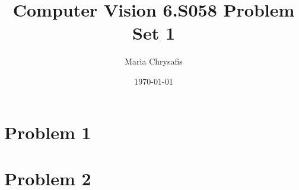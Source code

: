 \documentclass[a4paper]{article}
\author{Maria Chrysafis}
\date{\today}
\title{Computer Vision 6.S058 Problem Set 1}
\begin{document}
\maketitle
\section{Problem 1}
\section{Problem 2}
\end{document}
